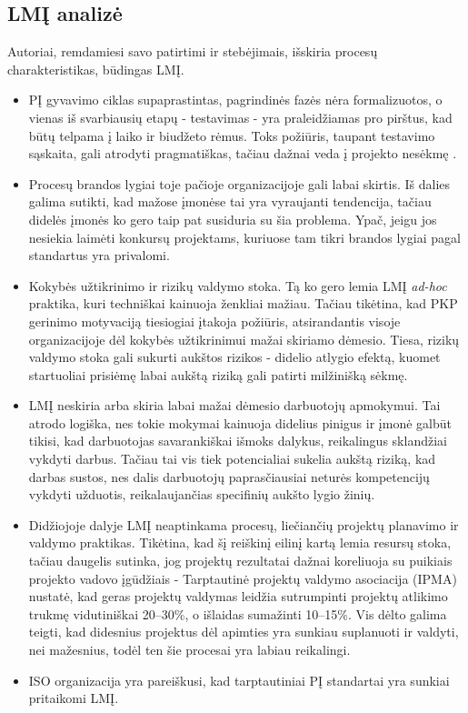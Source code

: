 \documentclass{VUMIFPSkursinis}
\begin{document}
\subsection{LMĮ analizė}
Autoriai, remdamiesi savo patirtimi ir stebėjimais, išskiria procesų charakteristikas, būdingas LMĮ. 
\begin{itemize}
    \item PĮ gyvavimo ciklas supaprastintas, pagrindinės fazės nėra formalizuotos, o vienas iš svarbiausių etapų - testavimas - yra praleidžiamas pro pirštus, kad būtų telpama į laiko ir biudžeto rėmus. Toks požiūris, taupant testavimo sąskaita, gali atrodyti pragmatiškas, tačiau dažnai veda į projekto nesėkmę \cite{charette2005software}.
    \item Procesų brandos lygiai toje pačioje organizacijoje gali labai skirtis. Iš dalies galima sutikti, kad mažose įmonėse tai yra vyraujanti tendencija, tačiau didelės įmonės ko gero taip pat susiduria su šia problema. Ypač, jeigu jos nesiekia laimėti konkursų projektams, kuriuose tam tikri brandos lygiai pagal standartus yra privalomi.
    \item Kokybės užtikrinimo ir rizikų valdymo stoka. Tą ko gero lemia LMĮ \textit{ad-hoc} praktika, kuri techniškai kainuoja ženkliai mažiau. Tačiau tikėtina, kad PKP gerinimo motyvaciją tiesiogiai įtakoja požiūris, atsirandantis visoje organizacijoje dėl kokybės užtikrinimui mažai skiriamo dėmesio. Tiesa, rizikų valdymo stoka gali sukurti aukštos rizikos - didelio atlygio efektą, kuomet startuoliai prisiėmę labai aukštą riziką gali patirti milžinišką sėkmę.
    \item LMĮ neskiria arba skiria labai mažai dėmesio darbuotojų apmokymui. Tai atrodo logiška, nes tokie mokymai kainuoja didelius pinigus ir įmonė galbūt tikisi, kad darbuotojas savarankiškai išmoks dalykus, reikalingus sklandžiai vykdyti darbus. Tačiau tai vis tiek potencialiai sukelia aukštą riziką, kad darbas sustos, nes dalis darbuotojų paprasčiausiai neturės kompetencijų vykdyti užduotis, reikalaujančias specifinių aukšto lygio žinių.
    \item Didžiojoje dalyje LMĮ neaptinkama procesų, liečiančių projektų planavimo ir valdymo praktikas. Tikėtina, kad šį reiškinį eilinį kartą lemia resursų stoka, tačiau daugelis sutinka, jog projektų rezultatai dažnai koreliuoja su puikiais projekto vadovo įgūdžiais - Tarptautinė projektų valdymo asociacija (IPMA) nustatė, kad geras projektų valdymas leidžia sutrumpinti projektų atlikimo trukmę vidutiniškai 20–30\%, o išlaidas sumažinti 10–15\%. Vis dėlto galima teigti, kad didesnius projektus dėl apimties yra sunkiau suplanuoti ir valdyti, nei mažesnius, todėl ten šie procesai yra labiau reikalingi.
    \item ISO organizacija yra pareiškusi, kad tarptautiniai PĮ standartai yra sunkiai pritaikomi LMĮ.
\end{itemize}
\end{document}
